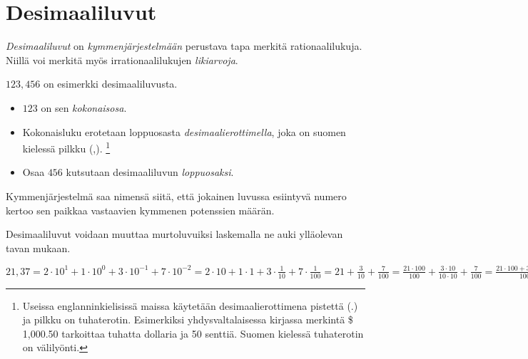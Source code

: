 \chapter{Desimaaliluvut}

\emph{Desimaaliluvut} on \emph{kymmenjärjestelmään} perustava tapa merkitä rationaalilukuja. Niillä voi merkitä myös irrationaalilukujen \emph{likiarvoja}.

$123,456$ on esimerkki desimaaliluvusta.

\begin{itemize}
	\item $123$ on sen \emph{kokonaisosa}.
	\item Kokonaisluku erotetaan loppuosasta \emph{desimaalierottimella}, joka on suomen kielessä pilkku (,).
	\footnote{Useissa englanninkielisissä maissa käytetään desimaalierottimena pistettä (.) ja pilkku on tuhaterotin. Esimerkiksi yhdysvaltalaisessa kirjassa merkintä \$ 1,000.50 tarkoittaa tuhatta dollaria ja 50 senttiä. Suomen kielessä tuhaterotin on välilyönti.}
	\item Osaa $456$ kutsutaan desimaaliluvun \emph{loppuosaksi}.
\end{itemize}


Kymmenjärjestelmä saa nimensä siitä, että jokainen luvussa esiintyvä numero kertoo sen paikkaa vastaavien kymmenen potenssien määrän.


Desimaaliluvut voidaan muuttaa murtoluvuiksi laskemalla ne auki ylläolevan tavan mukaan.

\begin{esimerkki}
$21,37 = 2 \cdot 10^1 + 1 \cdot 10^0 + 3 \cdot 10^{-1} + 7 \cdot 10^{-2} = 2 \cdot 10 + 1 \cdot 1 + 3 \cdot \frac{1}{10} + 7 \cdot \frac{1}{100} = 21 + \frac{3}{10} + \frac{7}{100} = \frac{21 \cdot 100}{100} + \frac{3 \cdot 10}{10 \cdot 10} + \frac{7}{100} = \frac{21 \cdot 100 + 3 \cdot 10 + 7}{100} = \frac{2100+30+7}{100} = \frac{2137}{100}$
\end{esimerkki}

